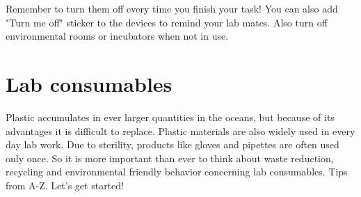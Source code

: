 	
\begin{suggest}{Remember to turn them off every time you finish your task!} 
	You can also add "Turn me off" sticker to the devices to remind your lab mates. 
	Also turn off environmental rooms or incubators when not in use.
\end{suggest}	

	
\section{Lab consumables}
Plastic accumulates in ever larger quantities in the oceans, but because of its advantages it is difficult to replace. 
Plastic materials are also widely used in every day lab work. Due to sterility, products like gloves and pipettes are often used only once. 
So it is more important than ever to think about waste reduction, recycling and environmental friendly behavior concerning lab consumables.
Tips from A-Z. Let's get started! 

